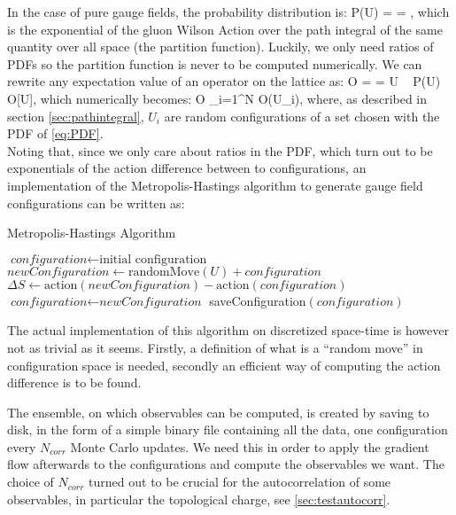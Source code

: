 In the case of pure gauge fields, the probability distribution is:
\beq
\label{eq:PDF}
    P(U) =  = ,
\eeq
which is the exponential of the gluon Wilson Action over the path integral of the same quantity over all space (the partition function). Luckily, we only need ratios of PDFs so the partition function is never to be computed numerically. We can rewrite any expectation value of an operator on the lattice as:
\beq
    \langle O \rangle =  = \int  \D U ~ P(U) O[U],
\eeq 
which numerically becomes:
\beq
\langle O \rangle \approx {} \sum_{i=1}^N O(U_i),
\eeq
where, as described in section \cref{sec:pathintegral}, $U_i$ are random configurations of a set chosen with the PDF of \cref{eq:PDF}. \\
Noting that, since we only care about ratios in the PDF, which turn out to be exponentials of the action difference between to configurations, an implementation of the Metropolis-Hastings algorithm to generate gauge field configurations can be written as: 
\begin{algorithm} [hbt!]
    \caption{Metropolis-Hastings Algorithm}\label{metropolis:algo}
    \begin{algorithmic}
    \State $\textit{configuration} \gets \text{initial configuration}$
                \State $\textit{newConfiguration}  \gets \text{randomMove}(U) + \textit{configuration}$  
                \State $\Delta S \gets \text{action} (\textit{newConfiguration}) - \text{action} (\textit{configuration})$
                    \State $\textit{configuration} \gets \textit{newConfiguration}$
                \EndIf
            \EndFor 
        \EndFor 
        \State saveConfiguration$(configuration)$
    \EndFor
    \end{algorithmic}  
\end{algorithm} 

The actual implementation of this algorithm on discretized space-time is however not as trivial as it seems. Firstly, a definition of what is a ``random move'' in configuration space is needed, secondly an efficient way of computing the action difference is to be found.

The ensemble, on which observables can be computed, is created by saving to disk, in the form of a simple binary file containing all the data,  one configuration every $N_{corr}$ Monte Carlo updates. We need this in order to apply the gradient flow afterwards to the configurations and compute the observables we want. The choice of $N_{corr}$ turned out to be crucial for the autocorrelation of some observables, in particular the topological charge, see \cref{sec:testautocorr}.

